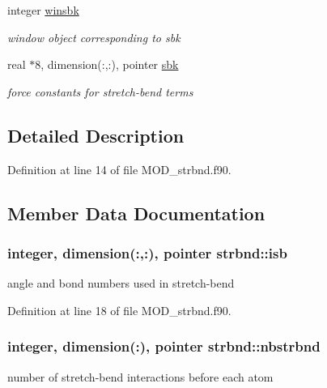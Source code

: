 \begin{DoxyCompactItemize}
integer \hyperlink{classstrbnd_a474b1bf0604b704ca1a33b2c926b4daa}{winsbk}
\begin{DoxyCompactList}\small\item\em window object corresponding to sbk \end{DoxyCompactList}\item 
real $\ast$8, dimension(\-:,\-:), pointer \hyperlink{classstrbnd_adba63e55ee5880bdc3fc2ff2393bc48d}{sbk}
\begin{DoxyCompactList}\small\item\em force constants for stretch-\/bend terms \end{DoxyCompactList}\end{DoxyCompactItemize}


\subsection{Detailed Description}


Definition at line 14 of file M\-O\-D\-\_\-strbnd.\-f90.



\subsection{Member Data Documentation}
\hypertarget{classstrbnd_ad98da9d62a5eeda5a4fa8e1451568454}{
\subsubsection[{isb}]{\setlength{\rightskip}{0pt plus 5cm}integer, dimension(\-:,\-:), pointer strbnd\-::isb}}\label{classstrbnd_ad98da9d62a5eeda5a4fa8e1451568454}


angle and bond numbers used in stretch-\/bend 



Definition at line 18 of file M\-O\-D\-\_\-strbnd.\-f90.

\hypertarget{classstrbnd_a626e1921cc286ea042a4c4f179082fd0}{
\subsubsection[{nbstrbnd}]{\setlength{\rightskip}{0pt plus 5cm}integer, dimension(\-:), pointer strbnd\-::nbstrbnd}}\label{classstrbnd_a626e1921cc286ea042a4c4f179082fd0}


number of stretch-\/bend interactions before each atom 



